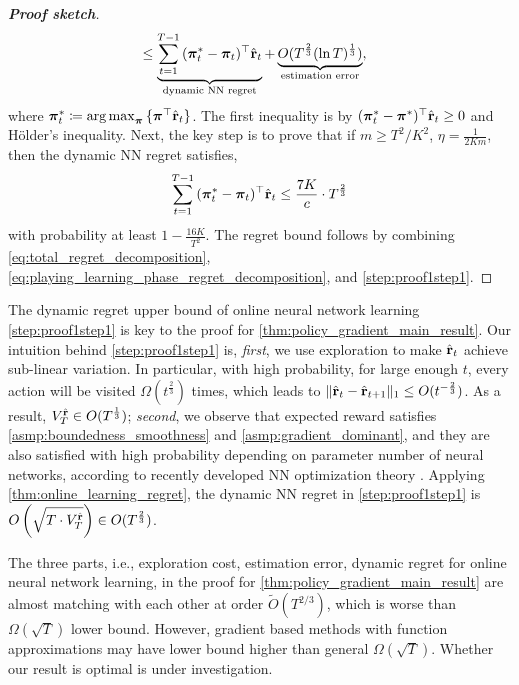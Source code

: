 \begin{proof}[\bf Proof sketch]
\begin{equation}
{\begin{split}
&\le \underbrace{ \sum\limits_{t=1}^{T-1}{ ( {{\boldsymbol{\pi}}_t^*} - {\boldsymbol{\pi}}_t )^\top \hat{{\mathbf{r}}}_t  } }_{\text{dynamic NN regret}} + \underbrace{ O(T^{\frac{2}{3}}( \ln{T} )^{\frac{1}{3}}) }_{\text{estimation error}},
\end{split}
}
\end{equation}
where ${\boldsymbol{\pi}}_t^* \coloneqq \operatorname*{arg\,max}_{{\boldsymbol{\pi}} }{\{ {\boldsymbol{\pi}}^\top \hat{{\mathbf{r}}}_t\}}$. The first inequality is by $( {\boldsymbol{\pi}}_t^* - {\boldsymbol{\pi}}^*)^\top \hat{{\mathbf{r}}}_t \ge 0$ and H{\" o}lder's inequality. Next, the key step is to prove that if $m \ge T^2 /K^2$, $\eta = \frac{1}{2 K m}$, then the dynamic NN regret satisfies,
\begin{equation}
\label{step:proof1step1}
\begin{split}
\sum\limits_{t=1}^{T-1}{ (  {{\boldsymbol{\pi}}_t^*} - {\boldsymbol{\pi}}_t )^\top \hat{{\mathbf{r}}}_t } \le \frac{7 K}{c} \cdot  T^{\frac{2}{3}}
\end{split}
\end{equation}
with probability at least $1 - \frac{16 K}{T^2}$.
The regret bound follows by combining \cref{eq:total_regret_decomposition}, \cref{eq:playing_learning_phase_regret_decomposition}, and \cref{step:proof1step1}.
\end{proof}
The dynamic regret upper bound of online neural network learning \cref{step:proof1step1} is key to the proof for \cref{thm:policy_gradient_main_result}. Our intuition behind \cref{step:proof1step1} is, \textit{first}, we use exploration to make $\hat{{\mathbf{r}}}_t$ achieve sub-linear variation. In particular, with high probability, for large enough $t$, every action will be visited $\Omega(t^{\frac{2}{3}})$ times, which leads to $\| \hat{{\mathbf{r}}}_t  - \hat{{\mathbf{r}}}_{t+1} \|_1 \le O(t^{-\frac{2}{3}})$. As a result, $V_T^{\hat{{\mathbf{r}}}} \in O(T^{\frac{1}{3}})$; \textit{second}, we observe that expected reward satisfies \cref{asmp:boundedness_smoothness} and \cref{asmp:gradient_dominant}, and they are also satisfied with high probability depending on parameter number of neural networks, according to recently developed NN optimization theory \citep{li2018learning,allen2018convergenceB}. Applying \cref{thm:online_learning_regret}, the dynamic NN regret in \cref{step:proof1step1} is $O\left(\sqrt{T \cdot V_T^{\hat{{\mathbf{r}}}} }\right) \in O(T^{\frac{2}{3}})$.

\begin{remk}
The three parts, i.e., exploration cost, estimation error, dynamic regret for online neural network learning, in the proof for \cref{thm:policy_gradient_main_result} are almost matching with each other at order $\tilde{O}(T^{2/3})$, which is worse than $\Omega(\sqrt{T})$ lower bound. However, gradient based methods with function approximations may have lower bound higher than general $\Omega(\sqrt{T})$. Whether our result is optimal is under investigation.
\end{remk}

